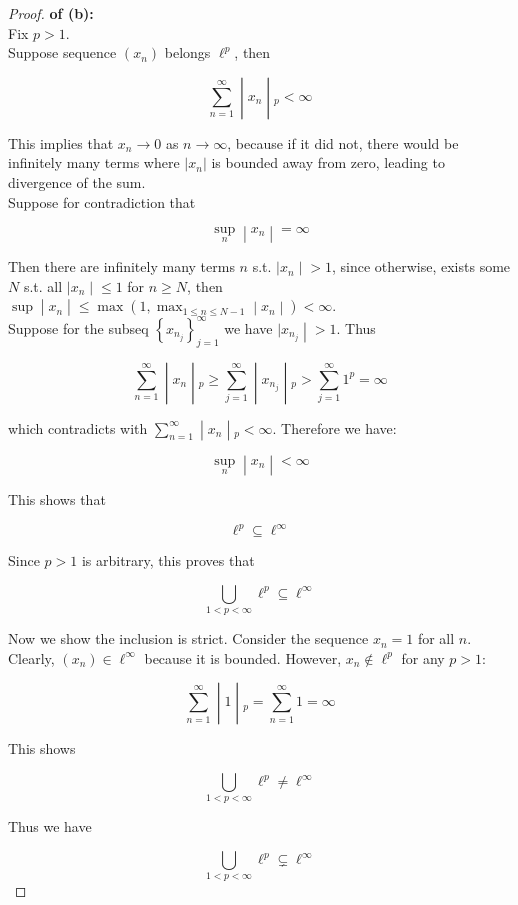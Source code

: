 \documentclass{qlnotes-export}
\begin{document}
\begin{proof}

\textbf{of (b):}\\
Fix \(p > 1\).\\
Suppose sequence \((x_{n})\) belongs \(\ell^{p}\), then

\[\left. \sum\limits_{n = 1}^{\infty} \middle| x_{n} \middle| {}_{p} < \infty \right.\]

This implies that \(x_{n}\rightarrow 0\) as \(n\rightarrow\infty\), because if it did not, there would be infinitely many terms where \(|x_{n}|\) is bounded away from zero, leading to divergence of the sum.\\
Suppose for contradiction that

\[\left. \sup\limits_{n} \middle| x_{n} \middle| = \infty \right.\]

Then there are infinitely many terms \(n\) s.t. \(\left. |x_{n} \middle| > 1 \right.\), since otherwise, exists some \(N\) s.t. all \(\left. |x_{n} \middle| \leq 1 \right.\) for \(n \geq N\), then \(\left. \sup \middle| x_{n} \middle| \leq \max(1,\max_{1 \leq n \leq N - 1} \middle| x_{n} \middle| ) < \infty \right.\).\\
Suppose for the subseq \(\left\{ x_{n_{j}} \right\}_{j = 1}^{\infty}\) we have \(\left. |x_{n_{j}} \middle| > 1 \right.\). Thus

\[\left. \sum\limits_{n = 1}^{\infty} \middle| x_{n} \middle| {}_{p} \geq \sum\limits_{j = 1}^{\infty} \middle| x_{n_{j}} \middle| {}_{p} > \sum\limits_{j = 1}^{\infty}1^{p} = \infty \right.\]

which contradicts with \(\left. \sum_{n = 1}^{\infty} \middle| x_{n} \middle| {}_{p} < \infty \right.\). Therefore we have:

\[\left. \sup\limits_{n} \middle| x_{n} \middle| < \infty \right.\]

This shows that

\[\ell^{p} \subseteq \ell^{\infty}\]

Since \(p > 1\) is arbitrary, this proves that

\[\bigcup\limits_{1 < p < \infty}\ell^{p} \subseteq \ell^{\infty}\]

Now we show the inclusion is strict. Consider the sequence \(x_{n} = 1\) for all \(n\). Clearly, \((x_{n}) \in \ell^{\infty}\) because it is bounded. However, \(x_{n} \notin \ell^{p}\) for any \(p > 1\):

\[\left. \sum\limits_{n = 1}^{\infty} \middle| 1 \middle| {}_{p} = \sum\limits_{n = 1}^{\infty}1 = \infty \right.\]

This shows

\[\bigcup\limits_{1 < p < \infty}\ell^{p} \neq \ell^{\infty}\]

Thus we have

\[\bigcup\limits_{1 < p < \infty}\ell^{p} \subsetneq \ell^{\infty}\]

\end{proof}
\end{document}

